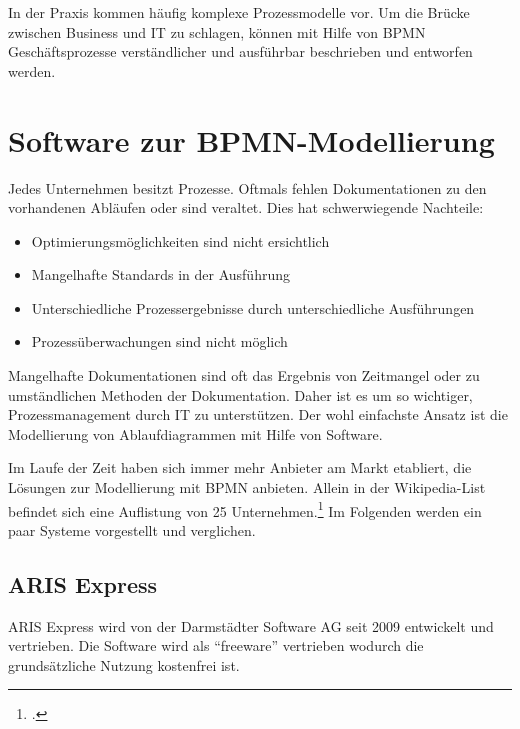 In der Praxis kommen häufig komplexe Prozessmodelle vor. 
Um die Brücke zwischen Business und IT zu schlagen, 
können mit Hilfe von BPMN Geschäftsprozesse verständlicher und ausführbar 
beschrieben und entworfen werden.\\




\clearpage
\section{Software zur BPMN-Modellierung}

Jedes Unternehmen besitzt Prozesse. Oftmals fehlen 
Dokumentationen zu den vorhandenen Abläufen oder sind veraltet. Dies hat
schwerwiegende Nachteile:

\begin{itemize}
\item Optimierungsmöglichkeiten sind nicht ersichtlich
\item Mangelhafte Standards in der Ausführung
\item Unterschiedliche Prozessergebnisse durch unterschiedliche Ausführungen
\item Prozessüberwachungen sind nicht möglich
\end{itemize}

Mangelhafte Dokumentationen sind oft das Ergebnis von Zeitmangel oder zu
umständlichen Methoden der Dokumentation. Daher ist es um so wichtiger,
Prozessmanagement durch IT zu unterstützen. Der wohl einfachste Ansatz 
ist die Modellierung von Ablaufdiagrammen mit Hilfe von
Software.

Im Laufe der Zeit haben sich immer mehr Anbieter am Markt etabliert,
die Lösungen zur Modellierung mit BPMN anbieten. Allein in der Wikipedia-List
befindet sich eine Auflistung von 25 Unternehmen.\footcite{wikitools} Im
Folgenden werden ein paar Systeme vorgestellt und verglichen.

\subsection{ARIS Express}

ARIS Express wird von der Darmstädter Software AG seit 2009 entwickelt und
vertrieben. Die Software wird als "`freeware"' vertrieben wodurch die
grundsätzliche Nutzung kostenfrei ist.

